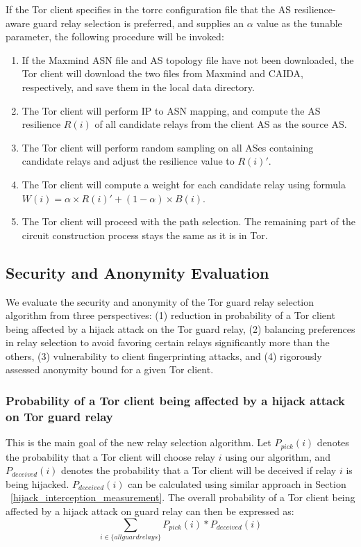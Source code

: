 If the Tor client specifies in the torrc configuration file that the AS resilience-aware guard relay selection is preferred, and supplies an $\alpha$ value as the tunable parameter, the following procedure will be invoked:

\begin{enumerate}
\item If the Maxmind ASN file and AS topology file have not been downloaded, the Tor client will download the two files from Maxmind and CAIDA, respectively, and save them in the local data directory. 
\item The Tor client will perform IP to ASN mapping, and compute the AS resilience $R(i)$ of all candidate relays from the client AS as the source AS. 
\item The Tor client will perform random sampling on all ASes containing candidate relays and adjust the resilience value to $R(i)\prime$.
\item The Tor client will compute a weight for each candidate relay using formula $W(i) = \alpha \times R(i) \prime + (1 - \alpha) \times B(i)$. 
\item The Tor client will proceed with the path selection. The remaining part of the circuit construction process stays the same as it is in Tor. 
\end{enumerate}

\subsection{Security and Anonymity Evaluation}
We evaluate the security and anonymity of the Tor guard relay selection algorithm from three perspectives: (1) reduction in probability of a Tor client being affected by a hijack attack on the Tor guard relay, (2) balancing preferences in relay selection to avoid favoring certain relays significantly more than the others, (3) vulnerability to client fingerprinting attacks, and (4) rigorously assessed anonymity bound for a given Tor client. 

\subsubsection{Probability of a Tor client being affected by a hijack attack on Tor guard relay}
\label{attack_probability}
This is the main goal of the new relay selection algorithm. Let $P_{pick}(i)$ denotes the probability that a Tor client will choose relay $i$ using our algorithm, and $P_{deceived}(i)$ denotes the probability that a Tor client will be deceived if relay $i$ is being hijacked. $P_{deceived}(i)$ can be calculated using similar approach in Section ~\ref{hijack_interception_measurement}. The overall probability of a Tor client being affected by a hijack attack on guard relay can then be expressed as:
\begin{equation*}
\sum_{i \in \{all guard relays\}} P_{pick}(i) * P_{deceived}(i)
\end{equation*}

